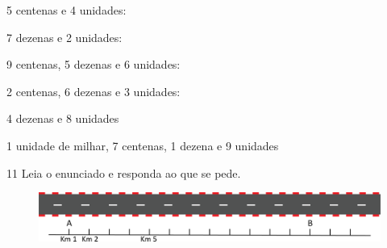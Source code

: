 \begin{escolha}
\item 5 centenas e 4 unidades:
\reduline{504\hfill}

\item 7 dezenas e 2 unidades:
\reduline{2\hfill}

\item 9 centenas, 5 dezenas e 6 unidades:
\reduline{956\hfill}

\item 2 centenas, 6 dezenas e 3 unidades:
\reduline{263\hfill}

\item 4 dezenas e 8 unidades
\reduline{48\hfill}

\item 1 unidade de milhar, 7 centenas, 1 dezena e 9 unidades
\reduline{1.719\hfill}

\end{escolha}

\num{11} Leia o enunciado e responda ao que se pede. 

\vspace{1em}

\begin{figure}[htpb!]
\centering
\includegraphics[width=\textwidth]{./media/image6.png}
\end{figure}

